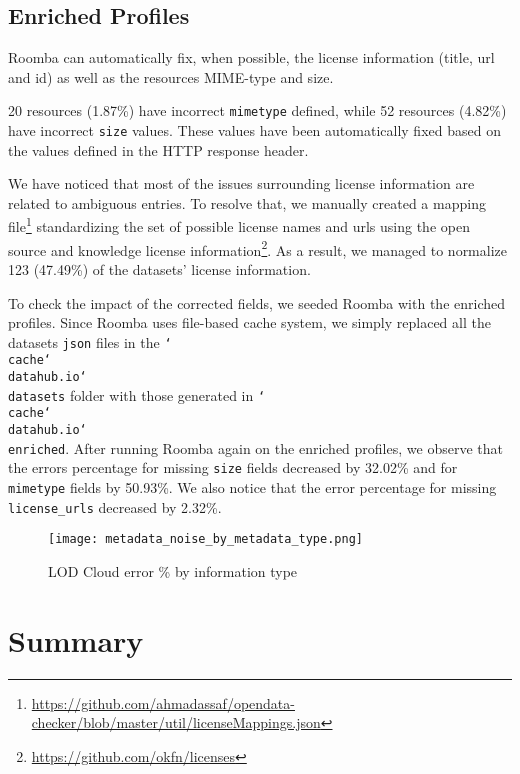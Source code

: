 \subsection{Enriched Profiles}
Roomba can automatically fix, when possible, the license information (title, url and id) as well as the resources MIME-type and size.

20 resources (1.87\%) have incorrect \texttt{mimetype} defined, while 52 resources (4.82\%) have incorrect \texttt{size} values. These values have been automatically fixed based on the values defined in the HTTP response header.

We have noticed that most of the issues surrounding license information are related to ambiguous entries. To resolve that, we manually created a mapping file\footnote{\url{https://github.com/ahmadassaf/opendata-checker/blob/master/util/licenseMappings.json}} standardizing the set of possible license names and urls using the open source and knowledge license information\footnote{\url{https://github.com/okfn/licenses}}. As a result, we managed to normalize 123 (47.49\%) of the datasets' license information.

To check the impact of the corrected fields, we seeded Roomba with the enriched profiles. Since Roomba uses file-based cache system, we simply replaced all the datasets \texttt{json} files in the \texttt{\char`\\ cache\char`\\ datahub.io\char`\\ datasets} folder with those generated in \texttt{\char`\\ cache\char`\\ datahub.io\char`\\ enriched}. After running Roomba again on the enriched profiles, we observe that the errors percentage for missing \texttt{size} fields decreased by 32.02\% and for \texttt{mimetype} fields by 50.93\%. We also notice that the error percentage for missing \texttt{license\_urls} decreased by 2.32\%.

\begin{figure}[!ht]
  \centering
  \texttt{[image: metadata\_noise\_by\_metadata\_type.png]}
  \caption{LOD Cloud error \% by information type}
  \label{fig:metadata_noise_by_metadata_type}
\end{figure}

\section{Summary}
\label{section:roomba_summary}

